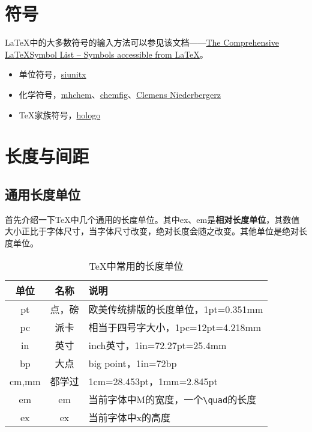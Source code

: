 \section{符号}

\LaTeX{}中的大多数符号的输入方法可以参见该文档——\href{https://www.ctan.org/pkg/comprehensive}{The Comprehensive \LaTeX Symbol List – Symbols accessible from \LaTeX}。

\begin{itemize}[nosep,leftmargin=2em]
    \item 单位符号，\href{https://www.ctan.org/pkg/siunitx}{siunitx}
    \item 化学符号，\href{https://www.ctan.org/pkg/mhchem}{mhchem}、\href{https://www.ctan.org/pkg/chemfig}{chemfig}、\href{https://www.ctan.org/author/niederberger}{Clemens Niederbergerz}
    \item \TeX{}家族符号，\href{https://www.ctan.org/pkg/hologo}{hologo}
\end{itemize}

\section{长度与间距}
\subsection*{通用长度单位}
首先介绍一下\TeX 中几个通用的长度单位。其中ex、em是\textbf{相对长度单位}，其数值大小正比于字体尺寸，当字体尺寸改变，绝对长度会随之改变。其他单位是绝对长度单位。

\begin{table}[!htb]
    \centering
    \caption{\TeX 中常用的长度单位}
    \label{TeX-length}
    \begin{tabular}{ccl}
        \toprule
        单位 & 名称 & 说明\\
        \midrule
        pt & 点，磅 & 欧美传统排版的长度单位，1pt=0.351mm\\
        pc & 派卡 & 相当于四号字大小，1pc=12pt=4.218mm\\
        in & 英寸 & inch英寸，1in=72.27pt=25.4mm\\
        bp & 大点 & big point，1in=72bp\\
        cm,mm & 都学过 & 1cm=28.453pt，1mm=2.845pt\\
        em & em & 当前字体中M的宽度，一个\lstinline|\quad|的长度\\
        ex & ex & 当前字体中x的高度\\
        \bottomrule
    \end{tabular}
\end{table}


